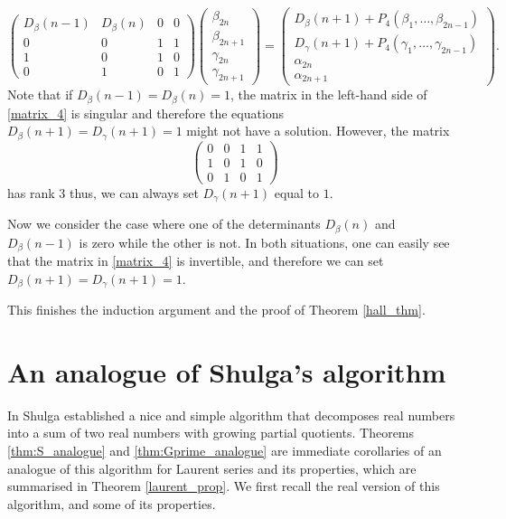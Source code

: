 \documentclass[a4paper,12pt]{article}
\newcommand{\HankelPolynomial}{D}
\begin{document}
{\begin{equation}
\label{matrix_4}
\begin{pmatrix}
\HankelPolynomial_{\beta}(n-1) & \HankelPolynomial_{\beta}(n) & 0 & 0 \\
0 & 0 & 1 & 1\\
1 & 0 & 1 & 0\\
0 & 1 & 0 & 1
\end{pmatrix}
\begin{pmatrix}
\beta_{2n}\\
\beta_{2n+1}\\
\gamma_{2n}\\
\gamma_{2n+1}
\end{pmatrix}
=
\begin{pmatrix}
\HankelPolynomial_{\beta}(n+1)+P_4(\beta_1,\ldots,\beta_{2n-1})\\
\HankelPolynomial_{\gamma}(n+1)+P_4(\gamma_1,\ldots,\gamma_{2n-1})\\
\alpha_{2n}\\
\alpha_{2n+1}
\end{pmatrix}.
\end{equation}
Note that if $\HankelPolynomial_{\beta}(n-1)=\HankelPolynomial_{\beta}(n)=1$, the matrix in the left-hand side of \eqref{matrix_4} is singular and therefore the equations $\HankelPolynomial_{\beta}(n+1)=\HankelPolynomial_{\gamma}(n+1)=1$ might not have a solution. However, the matrix
\begin{equation*}
\begin{pmatrix}
0 & 0 & 1 & 1\\
1 & 0 & 1 & 0\\
0 & 1 & 0 & 1
\end{pmatrix}
\end{equation*}
has rank $3$ thus, we can always set $\HankelPolynomial_{\gamma}(n+1)$ equal to $1$. 

Now we consider the case where one of the determinants $\HankelPolynomial_{\beta}(n)$ and $\HankelPolynomial_{\beta}(n-1)$ is zero while the other is not. In both situations, one can easily see that the matrix in \eqref{matrix_4} is invertible, and therefore we can set $\HankelPolynomial_{\beta}(n+1)=\HankelPolynomial_{\gamma}(n+1)=1$.
} 
This finishes the induction argument and the proof of Theorem \ref{hall_thm}.

\section{An analogue of Shulga's algorithm}\label{sec:shulga}
In \cite{shulga} Shulga established a nice and simple algorithm that decomposes real numbers into a sum of two real numbers with growing partial quotients. Theorems \ref{thm:S_analogue} and \ref{thm:Gprime_analogue} are immediate corollaries of an analogue of this algorithm for Laurent series and its properties, which are summarised in Theorem \ref{laurent_prop}. We first recall the real version of this algorithm, and some of its properties.
\end{document}
